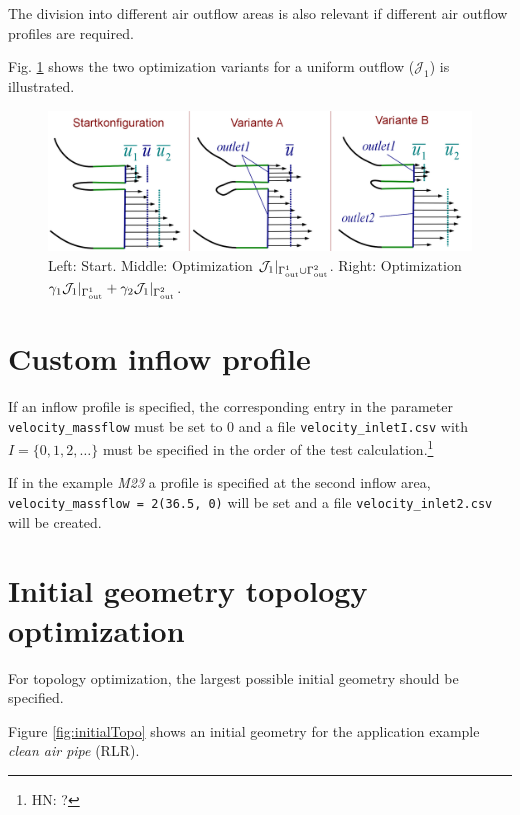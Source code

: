 \documentclass[a4paper,oneside]{book}
\numberwithin{equation}{section}
\begin{document}
The division into different air outflow areas is also relevant if different air outflow profiles are required.

Fig. \ref{fig:multiOutlet} shows the two optimization variants for a uniform outflow ($\mathcal{J}_1$) is illustrated.

\begin{figure}[htbp]
    \centering
    \includegraphics[scale=0.7]{outletMULT.png}   
    \caption{Left: Start. Middle: Optimization $\mathcal{J}_1|_{\Gamma_{\rm out}^1\cup\Gamma_{\rm out}^2}$. Right: Optimization $\gamma_1\mathcal{J}_1|_{\Gamma_{\rm out}^1} + \gamma_2\mathcal{J}_1|_{\Gamma_{\rm out}^2}$.}
    \label{fig:multiOutlet}
\end{figure}

\section{Custom inflow profile}
If an inflow profile is specified, the corresponding entry in the parameter \verb|velocity_massflow| must be set to 0 and a file \verb|velocity_inletI.csv| with $I = \{0,1,2,\ldots\}$ must be specified in the order of the test calculation.\footnote{HN: ?}

If in the example \textit{M23} a profile is specified at the second inflow area, \verb|velocity_massflow = 2(36.5, 0)| will be set and a file \verb|velocity_inlet2.csv| will be created.

\section{Initial geometry topology optimization}
For topology optimization, the largest possible initial geometry should be specified.

Figure \ref{fig:initialTopo} shows an initial geometry for the application example \textit{clean air pipe} (RLR).
\end{document}

